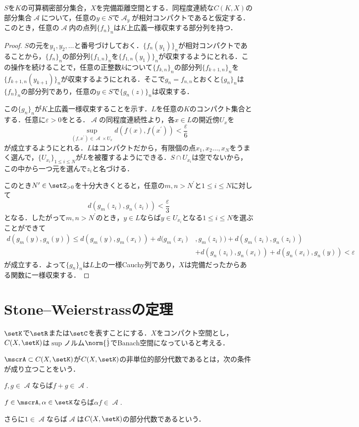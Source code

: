 \documentclass[uplatex]{jsarticle}
\begin{document}
\begin{theorem}
$S$を$K$の可算稠密部分集合，$X$を完備距離空間とする．同程度連続な$C(K,X)$の部分集合$\mscrA$について，任意の$y\in S$で$\mscrA_{y}$が相対コンパクトであると仮定する．このとき，任意の$\mscrA$内の点列$\{f_n\}_n$は$K$上広義一様収束する部分列を持つ．
\end{theorem}
\begin{proof}
$S$の元を$y_1,y_2,\dots$と番号づけしておく．$\{f_n(y_1)\}_n$が相対コンパクトであることから，$\{f_n\}_n$の部分列$\{f_{1,n}\}_n$を$\{f_{1,n}(y_1)\}_n$が収束するようにとれる．この操作を続けることで，任意の正整数$k$について$\{f_{k,n}\}_n$の部分列$\{f_{k+1,n}\}_n$を$\{f_{k+1,n}(y_{k+1})\}_n$が収束するようにとれる．そこで$g_n=f_{n,n}$とおくと$\{g_n\}_n$は$\{f_n\}_n$の部分列であり，任意の$y\in S$で$\{g_n(z)\}_n$は収束する．

この$\{g_n\}_n$が$K$上広義一様収束することを示す．$L$を任意の$K$のコンパクト集合とする．任意に$\varepsilon>0$をとる．$\mscrA$の同程度連続性より，各$x\in L$の開近傍$U_x$を
\[ \sup_{(f,x^\prime)\in \mscrA\times U_x} d(f(x),f(x^\prime)) < \frac{\varepsilon}{6} \]
が成立するようにとれる．$L$はコンパクトだから，有限個の点$x_1,x_2\dots,x_N$をうまく選んで，$\{U_{x_i}\}_{1\leq i\leq N}$が$L$を被覆するようにできる．$S\cap U_{x_i}$は空でないから，この中から一つ元を選んで$z_i$と名づける．

このとき$N^\prime\in \setZ_{>0}$を十分大きくとると，任意の$m,n>N^\prime$と$1\leq i\leq N$に対して
\[ d(g_m(z_i),g_n(z_i)) < \frac{\varepsilon}{3} \]
となる．したがって$m,n>N^\prime$のとき，$y\in L$ならば$y\in U_{x_i}$となる$1\leq i \leq N$を選ぶことができて
\begin{align*}
    d(g_m(y),g_n(y)) \leq d(g_m(y),g_m(x_i)) + d(g_m(x_i)&,g_m(z_i))+ d(g_m(z_i),g_n(z_i)) \\
    &+ d(g_n(z_i),g_n(x_i)) + d(g_n(x_i),g_n(y)) < \varepsilon
\end{align*}
が成立する．よって$\{g_n\}_n$は$L$上の一様Cauchy列であり，$X$は完備だったからある関数に一様収束する．
\end{proof}

\section{Stone--Weierstrassの定理}
$\setK$で$\setR$または$\setC$を表すことにする．$X$をコンパクト空間とし，$C(X,\setK)$は$\sup$ノルム$\norm{\dot}$でBanach空間になっていると考える．

\begin{definition}
$\mscrA\subset C(X,\setK)$が$C(X,\setK)$の非単位的部分代数であるとは，次の条件が成り立つことをいう．
\begin{enumarabicp}
\item $f,g\in \mscrA$ならば$f+g\in \mscrA.$
\item $f\in \mscrA,\alpha\in \setK$ならば$\alpha f\in \mscrA.$
\end{enumarabicp}
さらに$1\in \mscrA$ならば$\mscrA$は$C(X,\setK)$の部分代数であるという．
\end{definition}
\end{document}

